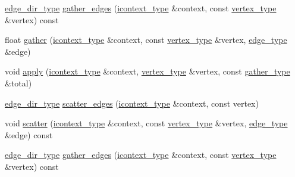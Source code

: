 \begin{DoxyCompactItemize}
\item 
\hyperlink{namespacesaedb_adf5ad13c09a48fb2f42f8e7348ea3ac3}{edge\-\_\-dir\-\_\-type} \hyperlink{classpagerank_a6d6353f113e4e2035c530a1e731e5a04}{gather\-\_\-edges} (\hyperlink{classsaedb_1_1sae__algorithm_a190f07adbc04f0188ad09b50dbe93a33}{icontext\-\_\-type} \&context, const \hyperlink{classsaedb_1_1sae__algorithm_ae26abf349aed2b0c9f82e1396b78561a}{vertex\-\_\-type} \&vertex) const 
\item 
float \hyperlink{classpagerank_a2538fd5fbef7bf5032ace5a9427079ca}{gather} (\hyperlink{classsaedb_1_1sae__algorithm_a190f07adbc04f0188ad09b50dbe93a33}{icontext\-\_\-type} \&context, const \hyperlink{classsaedb_1_1sae__algorithm_ae26abf349aed2b0c9f82e1396b78561a}{vertex\-\_\-type} \&vertex, \hyperlink{classsaedb_1_1sae__algorithm_aaebb1836596e0efad3d694a5b829871f}{edge\-\_\-type} \&edge)
\item 
void \hyperlink{classpagerank_aad9830119d9cdf6099749c97c707cb79}{apply} (\hyperlink{classsaedb_1_1sae__algorithm_a190f07adbc04f0188ad09b50dbe93a33}{icontext\-\_\-type} \&context, \hyperlink{classsaedb_1_1sae__algorithm_ae26abf349aed2b0c9f82e1396b78561a}{vertex\-\_\-type} \&vertex, const \hyperlink{classsaedb_1_1sae__algorithm_a4c57e65dd3987f19d5d90bf394c8f2f8}{gather\-\_\-type} \&total)
\item 
\hyperlink{namespacesaedb_adf5ad13c09a48fb2f42f8e7348ea3ac3}{edge\-\_\-dir\-\_\-type} \hyperlink{classpagerank_a6cd84868333a4481a4d824bff82f2649}{scatter\-\_\-edges} (\hyperlink{classsaedb_1_1sae__algorithm_a190f07adbc04f0188ad09b50dbe93a33}{icontext\-\_\-type} \&context, const vertex)
\item 
void \hyperlink{classpagerank_a6216a1bceaf95e35325a0e6d70af35dd}{scatter} (\hyperlink{classsaedb_1_1sae__algorithm_a190f07adbc04f0188ad09b50dbe93a33}{icontext\-\_\-type} \&context, const \hyperlink{classsaedb_1_1sae__algorithm_ae26abf349aed2b0c9f82e1396b78561a}{vertex\-\_\-type} \&vertex, \hyperlink{classsaedb_1_1sae__algorithm_aaebb1836596e0efad3d694a5b829871f}{edge\-\_\-type} \&edge) const 
\item 
\hyperlink{namespacesaedb_adf5ad13c09a48fb2f42f8e7348ea3ac3}{edge\-\_\-dir\-\_\-type} \hyperlink{classpagerank_a6d6353f113e4e2035c530a1e731e5a04}{gather\-\_\-edges} (\hyperlink{classsaedb_1_1sae__algorithm_a190f07adbc04f0188ad09b50dbe93a33}{icontext\-\_\-type} \&context, const \hyperlink{classsaedb_1_1sae__algorithm_ae26abf349aed2b0c9f82e1396b78561a}{vertex\-\_\-type} \&vertex) const 
\item 

\end{DoxyCompactItemize}
